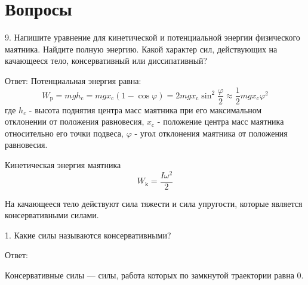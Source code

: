 \section{Вопросы}

9.	Напишите уравнение для кинетической и потенциальной энергии физического маятника. Найдите полную энергию. Какой характер сил, действующих на качающееся тело, консервативный или диссипативный?

Ответ:
Потенциальная энергия  равна:
\begin{equation}\label{equestionsEq:potentionEnergy}
    W_{\mathrm{p}}
    =m g h_{\mathrm{c}}
    =m g x_{\mathrm{c}}\left(1-\cos \varphi\right)
    =2 m g x_{\mathrm{c}} \sin ^2 \frac{\varphi}{2}
    \approx \frac{1}{2} m g x_{\mathrm{c}} \varphi^2
\end{equation}
где $h_c$ - высота поднятия центра масс маятника при его максимальном отклонении от положения равновесия, $x_{\mathrm{c}}$ - положение центра масс маятника относительно его точки подвеса, $\varphi$ - угол отклонения маятника от положения равновесия.

Кинетическая энергия маятника
\begin{equation}\label{equestionsEq:keneticEnergy}
    W_{\mathrm{k}}=\frac{I \omega^2}{2}
\end{equation}

На качающееся тело действуют сила тяжести и сила упругости, которые является консервативными силами.


1.	Какие силы называются консервативными?

Ответ:

Консервативные силы — силы, работа которых по замкнутой траектории равна 0.

\newpage